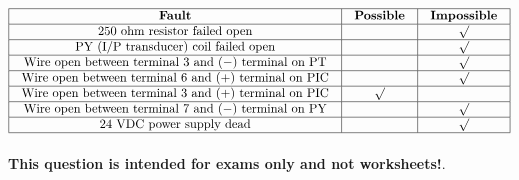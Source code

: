 






$$\vbox{\offinterlineskip
\halign{\strut
\vrule \quad\hfil # \ \hfil & 
\vrule \quad\hfil # \ \hfil & 
\vrule \quad\hfil # \ \hfil \vrule \cr
\noalign{\hrule}
%
{\bf Fault} & {\bf Possible} & {\bf Impossible} \cr
%
\noalign{\hrule}
%
250 ohm resistor failed open &  & $\surd$ \cr
%
\noalign{\hrule}
%
PY (I/P transducer) coil failed open &  & $\surd$ \cr
%
\noalign{\hrule}
%
Wire open between terminal 3 and ($-$) terminal on PT &  & $\surd$ \cr
%
\noalign{\hrule}
%
Wire open between terminal 6 and (+) terminal on PIC &  & $\surd$ \cr
%
\noalign{\hrule}
%
Wire open between terminal 3 and (+) terminal on PIC & $\surd$ &  \cr
%
\noalign{\hrule}
%
Wire open between terminal 7 and ($-$) terminal on PY &  & $\surd$ \cr
%
\noalign{\hrule}
%
24 VDC power supply dead &  & $\surd$ \cr
%
\noalign{\hrule}
} %
}$$ %







{\bf This question is intended for exams only and not worksheets!}.



